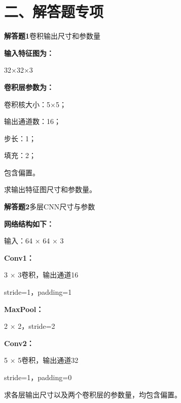 \documentclass[UTF8,openany,oneside,zihao=-4,fontset=windows]{ctexbook}
\newif\ifshowsolutions
\newcommand{\Question}[2]{%
  \par\Needspace{4\baselineskip}\medskip
  \noindent\textbf{\color{MVBlue}#1}\quad #2\par
}
\newenvironment{AnswerBox}{\begin{tcolorbox}[breakable,colback=MVLight,colframe=MVBlue!45,title={参考答案},fonttitle=\bfseries,boxrule=0.55pt,arc=1.5mm,left=2mm,right=2mm,top=1.5mm,bottom=1.5mm]}{\end{tcolorbox}}
\newcommand{\PracticeSpace}[1]{\ifshowsolutions\else\par\vspace{#1}\par\fi}
\begin{document}
\section{二、解答题专项}
\Question{解答题1}{卷积输出尺寸和参数量}
\par\noindent\textbf{输入特征图为：}
\par 32×32×3
\par\noindent\textbf{卷积层参数为：}
\par\noindent\textbullet\quad 卷积核大小：5×5；
\par\noindent\textbullet\quad 输出通道数：16；
\par\noindent\textbullet\quad 步长：1；
\par\noindent\textbullet\quad 填充：2；
\par 包含偏置。
\par 求输出特征图尺寸和参数量。
\ifshowsolutions
\begin{AnswerBox}
\par\noindent\textbf{输出高度：}
\begin{center}\small\ttfamily H\_out = (32 + 2×2 - 5)/1 + 1 = 32\end{center}
\par\noindent\textbf{输出宽度同样为32，输出通道数为16：}
\par 32×32×16
\par\noindent\textbf{每个卷积核参数量为：}
\par 5×5×3+1=76
\par\noindent\textbf{共有16个卷积核：}
\par 76×16=1216
\par\noindent\textbf{因此参数量为：}
\par 1216
\end{AnswerBox}
\else
\PracticeSpace{4.2cm}
\fi
\Question{解答题2}{多层CNN尺寸与参数}
\par\noindent\textbf{网络结构如下：}
\par 输入：64 × 64 × 3
\par\noindent\textbf{Conv1：}
\par 3 × 3卷积，输出通道16
\par stride=1，padding=1
\par\noindent\textbf{MaxPool：}
\par 2 × 2，stride=2
\par\noindent\textbf{Conv2：}
\par 5 × 5卷积，输出通道32
\par stride=1，padding=0
\par 求各层输出尺寸以及两个卷积层的参数量，均包含偏置。
\end{document}

